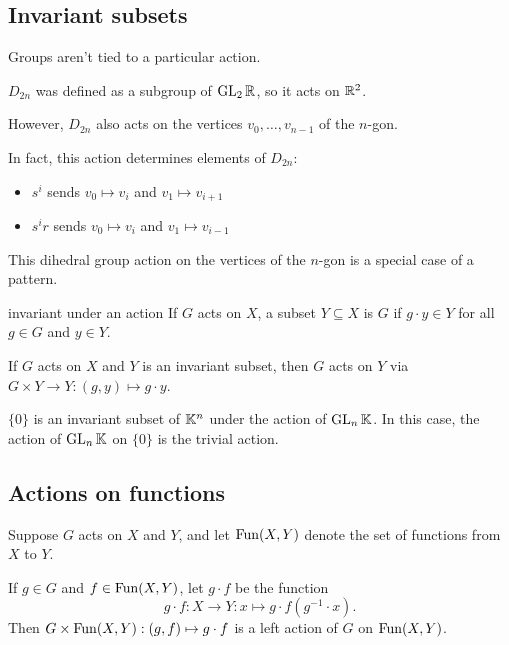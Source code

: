 \documentclass[12pt,letterpaper]{report}
\begin{document}
\pagebreak
\subsection{Invariant subsets}

Groups aren't tied to a particular action.

\begin{ex}
  $D_{2n}$ was defined as a subgroup of $\operatorname{GL}_2\mathbb{R}$, so it acts on $\mathbb{R}^2$.

  However, $D_{2n}$ also acts on the vertices $v_0, \ldots, v_{n - 1}$ of the $n$-gon.

  In fact, this action determines elements of $D_{2n}$:
  \begin{itemize}
    \item $s^i$ sends $v_0 \mapsto v_i$ and $v_1 \mapsto v_{i + 1}$
    \item $s^i r$ sends $v_0 \mapsto v_i$ and $v_1 \mapsto v_{i - 1}$
  \end{itemize}
\end{ex}

This dihedral group action on the vertices of the $n$-gon is a special case of a pattern.

\begin{defn}{invariant under an action}{}
  If $G$ acts on $X$, a subset $Y \subseteq X$ is  $G$ if
  $g \cdot y \in Y$ for all $g \in G$ and $y \in Y$.
\end{defn}

\begin{lem}{}{}
  If $G$ acts on $X$ and $Y$ is an invariant subset, then $G$ acts on $Y$ via
  $G \times Y \to Y : (g, y) \mapsto g \cdot y$.
\end{lem}

\begin{ex}
  $\{0\}$ is an invariant subset of $\mathbb{K}^n$ under the action of $\operatorname{GL}_n\mathbb{K}$.
  In this case, the action of $\operatorname{GL}_n\mathbb{K}$ on $\{0\}$ is the trivial action.
\end{ex}

\pagebreak
\subsection{Actions on functions}

\begin{prop}{}{}
  Suppose $G$ acts on $X$ and $Y$, and let $\operatorname{Fun}(X, Y)$ denote the set of functions from $X$ to $Y$.

  If $g \in G$ and $f \in \operatorname{Fun}(X, Y)$, let $g \cdot f$ be the function
  \[ g \cdot f \colon X \to Y : x \mapsto g \cdot f(g^{-1} \cdot x). \]
  Then $G \times \operatorname{Fun}(X, Y) : (g, f) \mapsto g \cdot f$ is a left action of $G$ on $\operatorname{Fun}(X, Y)$.
\end{prop}
\end{document}

